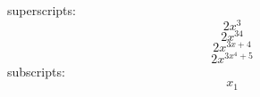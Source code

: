 \documentclass[12pt]{article}
\begin{document}
superscripts: $$2x^3$$
$$2x^{34}$$
$$2x^{3x+4}$$
$$2x^{3x^4+5}$$
subscripts: $$x_1$$
\end{document}
